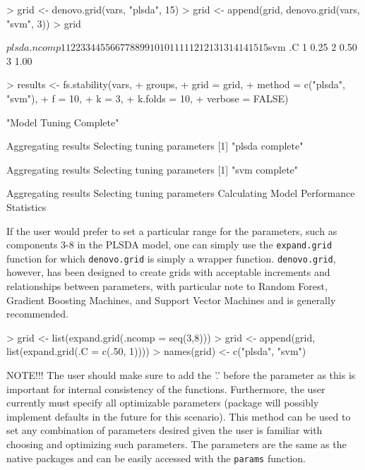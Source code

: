\documentclass[12pt]{article}
\renewenvironment{Schunk}{\vspace{\topsep}}{\vspace{\topsep}}
\begin{document}
\begin{Schunk}
\begin{Sinput}
> grid <- denovo.grid(vars, "plsda", 15)
> grid <- append(grid, denovo.grid(vars, "svm", 3)) 
> grid
\end{Sinput}
\begin{Soutput}
$plsda
   .ncomp
1       1
2       2
3       3
4       4
5       5
6       6
7       7
8       8
9       9
10     10
11     11
12     12
13     13
14     14
15     15

$svm
    .C
1 0.25
2 0.50
3 1.00
\end{Soutput}
\begin{Sinput}
> results <- fs.stability(vars, 
+                         groups, 
+                         grid = grid,
+                         method = c("plsda", "svm"), 
+                         f = 10, 
+                         k = 3, 
+                         k.folds = 10, 
+                         verbose = FALSE)
\end{Sinput}
\begin{Soutput}
[1] "Model Tuning Complete"

Aggregating results
Selecting tuning parameters
[1] "plsda complete"

Aggregating results
Selecting tuning parameters
[1] "svm complete"

Aggregating results
Selecting tuning parameters
Calculating Model Performance Statistics
\end{Soutput}
\end{Schunk}

If the user would prefer to set a particular range for the parameters, such as components 3-8 in the PLSDA model, one can simply use the {\tt expand.grid} function for which {\tt denovo.grid} is simply a wrapper function.  {\tt denovo.grid}, however, has been designed to create grids with acceptable increments and relationships between parameters, with particular note to Random Forest, Gradient Boosting Machines, and Support Vector Machines and is generally recommended.

\begin{Schunk}
\begin{Sinput}
> grid <- list(expand.grid(.ncomp = seq(3,8)))
> grid <- append(grid, list(expand.grid(.C = c(.50, 1))))
> names(grid) <- c("plsda", "svm")
\end{Sinput}
\end{Schunk}

NOTE!!! The user should make sure to add the '.' before the parameter as this is important for internal consistency of the functions.  Furthermore, the user currently must specify all optimizable parameters (package will possibly implement defaults in the future for this scenario).  This method can be used to set any combination of parameters desired given the user is familiar with choosing and optimizing such parameters.  The parameters are the same as the native packages and can be easily accessed with the {\tt params} function.
\end{document}
